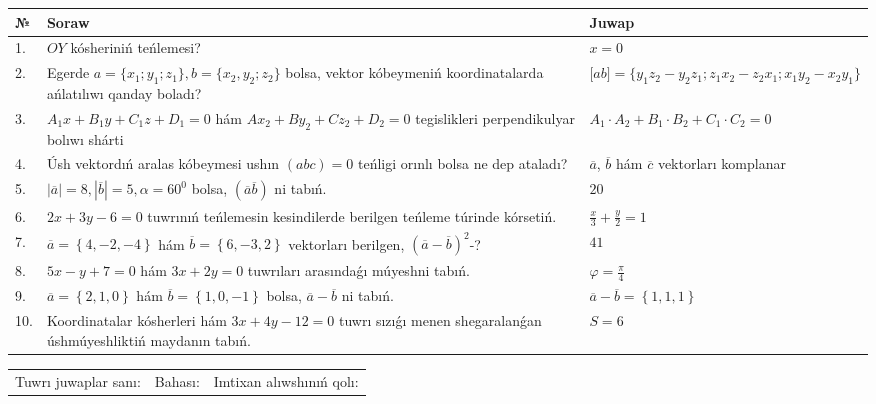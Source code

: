\documentclass{article}
\begin{document}
\begin{tabular}{|m{0.7cm}|m{10cm}|m{4cm}|}
\hline
№ & Soraw & Juwap \\
\hline
1. & $OY$ kósheriniń teńlemesi? & $x=0$ \\
\hline
2. & Egerde $a=\{ x_1; y_1; z_1\}, b=\{ x_2, y_2; z_2\}$ bolsa, vektor kóbeymeniń koordinatalarda ańlatılıwı qanday boladı? &  $\lbrack ab\rbrack=\{y_1z_2-y_2z_1; z_1x_2-z_2x_1; x_1y_2-x_2y_1\}$ \\
\hline
3. & $A_1x+B_1y+C_1z+D_1=0$ hám $Ax_2+By_2+Cz_2+D_2=0$ tegislikleri perpendikulyar bolıwı shárti & $A_1\cdot A_2+B_1\cdot B_2+C_1\cdot C_2=0$ \\
\hline
4. & Úsh vektordıń aralas kóbeymesi ushın $(abc)=0$ teńligi orınlı bolsa ne dep ataladı? & $\overline{a}$, $\overline{b}$ hám $\overline{c}$ vektorları komplanar \\
\hline
5. & $\left| \overline{a} \right|=8, \left| \overline{b} \right|=5, \alpha=60^{0}$ bolsa, $( \overline{a}\overline{b} )$ ni tabıń. & $20$ \\
\hline
6. & $2x+3y-6=0$ tuwrınıń teńlemesin kesindilerde berilgen teńleme túrinde kórsetiń. & $\frac{x}{3} + \frac{ y }{ 2 } =  1$ \\
\hline
7. & $\overline{a}=\left\{ 4,-2,-4 \right\}$ hám $\overline{b}=\left\{ 6,-3, 2 \right\}$ vektorları berilgen, $(\overline{a}-\overline{b}) ^{2}$-? & $41$ \\
\hline
8. & $5x-y+7=0$ hám $3x+2y=0$ tuwrıları arasındaǵı múyeshni tabıń. & $\varphi=\frac{\pi}{4}$ \\
\hline
9. & $\overline{a}=\left\{ 2, 1, 0 \right\}$ hám $\overline{b}=\left\{ 1, 0,-1 \right\}$ bolsa, $\overline{a}-\overline{b}$ ni tabıń. & $\overline{a} -\overline{b} = \left\{ 1,1,1 \right\}$ \\
\hline
10. & Koordinatalar kósherleri hám $ 3x+4y-12=0 $ tuwrı sızıǵı menen shegaralanǵan úshmúyeshliktiń maydanın tabıń. & $ S=6 $ \\
\hline
\end{tabular}

\vspace{1cm}

\begin{tabular}{lll}
Tuwrı juwaplar sanı: \underline{\hspace{1.5cm}} & 
Bahası: \underline{\hspace{1.5cm}} & 
Imtixan alıwshınıń qolı: \underline{\hspace{2cm}} \\
\end{tabular}
\end{document}
